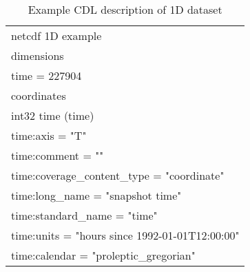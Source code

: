 \begin{longtable}{|p{\textwidth}|}
\caption{Example CDL description of 1D dataset}
\label{tab:cdl-1D} \\
\hline \endhead
\hline \endfoot
netcdf 1D example\\
dimensions\\
\hline
\rowcolor{YellowGreen}  time = 227904\\
\hline

coordinates\\
\hline
\rowcolor{Apricot}\hspace{0.5cm}int32 time (time)\\
\rowcolor{Apricot}\hspace{0.5cm}\hspace{0.5cm}time:axis = "T"\\
\rowcolor{Apricot}\hspace{0.5cm}\hspace{0.5cm}time:comment = ""\\
\rowcolor{Apricot}\hspace{0.5cm}\hspace{0.5cm}time:coverage\_content\_type = "coordinate"\\
\rowcolor{Apricot}\hspace{0.5cm}\hspace{0.5cm}time:long\_name = "snapshot time"\\
\rowcolor{Apricot}\hspace{0.5cm}\hspace{0.5cm}time:standard\_name = "time"\\
\rowcolor{Apricot}\hspace{0.5cm}\hspace{0.5cm}time:units = "hours since 1992-01-01T12:00:00"\\
\rowcolor{Apricot}\hspace{0.5cm}\hspace{0.5cm}time:calendar = "proleptic\_gregorian"\\
\hline


\end{longtable}

